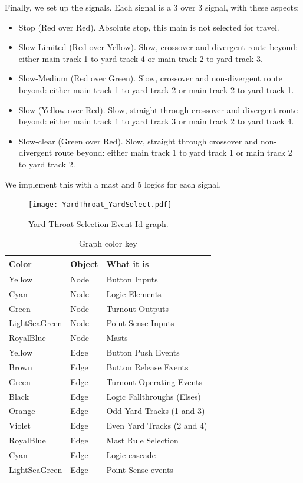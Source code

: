 Finally, we set up the signals.  Each signal is a 3 over 3 signal, with these 
aspects:

\begin{itemize}
\item Stop (Red over Red). Absolute stop, this main is not selected for 
travel.
\item Slow-Limited (Red over Yellow). Slow, crossover and divergent route 
beyond: either main track 1 to yard track 4 or main track 2 to yard track 3.
\item Slow-Medium (Red over Green). Slow, crossover and non-divergent route 
beyond: either main track 1 to yard track 2 or main track 2 to yard track 1.
\item Slow (Yellow over Red). Slow, straight through crossover and 
divergent route beyond: either main track 1 to yard track 3 or main track 2 to 
yard track 4.
\item Slow-clear (Green over Red). Slow, straight through crossover and 
non-divergent route beyond: either main track 1 to yard track 1 or main track 
2 to yard track 2.
\end{itemize}

We implement this with a mast and 5 logics for each signal. 

\begin{figure}[hbpt]\begin{centering}%
\texttt{[image: YardThroat\_YardSelect.pdf]}
\caption{Yard Throat Selection Event Id graph.}
\label{fig:YardThroatYardSelect}
\end{centering}\end{figure}
\begin{table}[hbpt]\begin{centering}%
\begin{tabular}{|l|l|p{2in}|}
\hline
Color&Object&What it is\\
\hline
Yellow&Node&Button Inputs\\
\hline
Cyan&Node&Logic Elements\\
\hline
Green&Node&Turnout Outputs\\
\hline
LightSeaGreen&Node&Point Sense Inputs\\
\hline
RoyalBlue&Node&Masts\\
\hline 
Yellow&Edge&Button Push Events\\
\hline
Brown&Edge&Button Release Events\\
\hline
Green&Edge&Turnout Operating Events\\
\hline
Black&Edge&Logic Fallthroughs (Elses)\\
\hline
Orange&Edge&Odd Yard Tracks (1 and 3)\\
\hline
Violet&Edge&Even Yard Tracks (2 and 4)\\
\hline
RoyalBlue&Edge&Mast Rule Selection\\
\hline
Cyan&Edge&Logic cascade\\
\hline
LightSeaGreen&Edge&Point Sense events\\
\hline
\end{tabular}
\caption{Graph color key}
\label{tab:YardThroatYardSelect}
\end{centering}\end{table}

